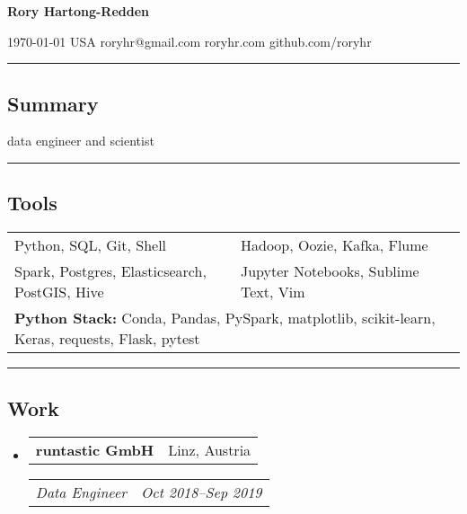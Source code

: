 \documentclass[10pt,letterpaper]{article}
\makeatletter
\newenvironment{indentsection}[1]
{\begin{list}{}%
	{\setlength{\leftmargin}{#1}}
	\item[]%
}
{\end{list}}
\newcommand{\headerrow}[2]{
\begin{tabular*}{\linewidth}{l@{\extracolsep{\fill}}r}
		#1 &
		#2 \\
	\end{tabular*}
}
\newcommand{\jobitem}[4]{\item \headerrow{\textbf{#1}}{#2}
\headerrow{\emph{#3}}{\emph{#4}}}
\makeatother
\begin{document}
{\raggedright \LARGE \bf Rory Hartong-Redden\\}

{\raggedleft 
\today \/ \textbar
\/ USA \textbar
\/ roryhr@gmail.com \textbar
\/ roryhr.com \textbar\/   
github.com/roryhr\\
}
\hrule

\subsection*{Summary}
\begin{centering}  
data engineer and scientist \\
\end{centering}

\hrule
\subsection*{Tools}
\begin{indentsection}{\parindent}
\begin{tabular}{p{0.5\linewidth}   p{0.5\linewidth}} 
	Python, SQL, Git, Shell
	& Hadoop, Oozie, Kafka, Flume\\

	Spark, Postgres, Elasticsearch, PostGIS, Hive 
	& Jupyter Notebooks, Sublime Text, Vim\\ 
	
	\multicolumn{2}{l}{
		\textbf{Python Stack:} Conda, Pandas, PySpark, matplotlib, scikit-learn,
							Keras, requests, Flask, pytest} \\
\end{tabular}
\end{indentsection}

\hrule
\subsection*{Work}
\begin{itemize}
	\jobitem{runtastic GmbH}{Linz, Austria}
		     {Data Engineer}{Oct 2018--Sep 2019}
\end{itemize}
\end{document}
